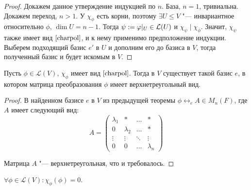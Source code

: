 \begin{proof}
	Докажем данное утверждение индукцией по $n$. База, $n = 1$, тривиальна. Докажем переход, $n > 1$. У $\chi_\phi$ есть корни, поэтому $\exists U \le V$ "--- инвариантное относительно $\phi$, $\dim{U} = n - 1$. Тогда $\psi := \phi|_U \hm{\in} \mathcal{L}(U)$ и $\chi_\psi\mid \chi_\phi$. Значит, $\chi_\psi$ также имеет вид $\eqref*{charpol}$, и к нему применимо предположение индукции. Выберем подходящий базис $e'$ в $U$ и дополним его до базиса в $V$, тогда полученный базис и будет искомым в $V$.
\end{proof}

\begin{corollary}
	Пусть $\phi \in \mathcal{L}(V)$, $\chi_\phi$ имеет вид $\eqref*{charpol}$. Тогда в $V$ существует такой базис $e$, в котором матрица преобразования $\phi$ имеет верхнетреугольный вид.
\end{corollary}

\begin{proof}
	В найденном базисе $e$ в $V$ из предыдущей теоремы $\phi \leftrightarrow_e A \in M_n(F)$, где $A$ имеет следующий вид:
	\[A = \begin{pmatrix}
		\lambda_1 & * & \dots & *\\
		0 & \lambda_2 & \dots & *\\
		\vdots & \vdots & \ddots & \vdots\\
		0 & 0 & \dots & \lambda_n
	\end{pmatrix}\]

	Матрица $A$ "--- верхнетреугольная, что и требовалось.
\end{proof}

\begin{theorem}
	$\forall \phi \in \mathcal{L}(V): \chi_\phi(\phi) = 0$.
\end{theorem}

